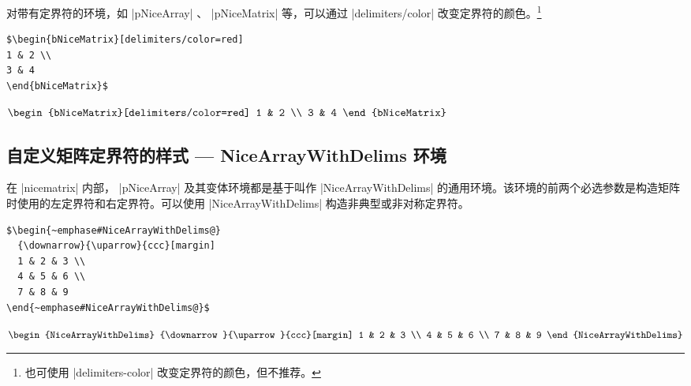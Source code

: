 \documentclass[dvipsnames]{article}%
\begin{document}
对带有定界符的环境，如 |{pNiceArray}| 、 |{pNiceMatrix}| 等，可以通过 |delimiters/color| 改变定界符的颜色。\footnote{也可使用 |delimiters-color| 改变定界符的颜色，但不推荐。}

\bigskip
\begin{BVerbatim}[boxwidth=12cm,baseline=c]
$\begin{bNiceMatrix}[delimiters/color=red]
1 & 2 \\
3 & 4 
\end{bNiceMatrix}$
\end{BVerbatim}
$\begin{bNiceMatrix}[delimiters/color=red]
1 & 2 \\
3 & 4 
\end{bNiceMatrix}$


\subsection{自定义矩阵定界符的样式 --- NiceArrayWithDelims 环境}
\label{zm:非对称定界符}

在 |nicematrix| 内部， |{pNiceArray}| 及其变体环境都是基于叫作 |{NiceArrayWithDelims}| 的通用环境。该环境的前两个必选参数是构造矩阵时使用的左定界符和右定界符。可以使用 |{NiceArrayWithDelims}| 构造非典型或非对称定界符。

\bigskip
\begin{BVerbatim}[baseline=c,boxwidth=11cm]
$\begin{~emphase#NiceArrayWithDelims@}
  {\downarrow}{\uparrow}{ccc}[margin]
  1 & 2 & 3 \\
  4 & 5 & 6 \\
  7 & 8 & 9 
\end{~emphase#NiceArrayWithDelims@}$
\end{BVerbatim}
$\begin{NiceArrayWithDelims}
  {\downarrow}{\uparrow}{ccc}[margin]
  1 & 2 & 3 \\
  4 & 5 & 6 \\
  7 & 8 & 9 
\end{NiceArrayWithDelims}$
\end{document}
